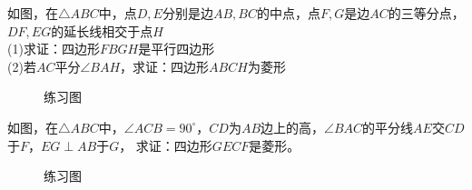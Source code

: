 \begin{problem}
如图，在$\triangle ABC$中，点$D,E$分别是边$AB,BC$的中点，点$F,G$是边$AC$的三等分点，$DF,EG$的延长线相交于点$H$ \\
(1)求证：四边形$FBGH$是平行四边形 \\
(2)若$AC$平分$\angle BAH$，求证：四边形$ABCH$为菱形 \\
\end{problem}
\begin{figure}[H]
    \centering
    \resizebox{4cm}{!}{}
    \caption{练习图}
\end{figure}
\begin{problem}
如图，在$\triangle ABC$中，$\angle ACB=90^\circ$，$CD$为$AB$边上的高，$\angle BAC$的平分线$AE$交$CD$于$F$，$EG\perp AB$于$G$，
求证：四边形$GECF$是菱形。
\end{problem}
\begin{figure}[H]
    \centering
    \resizebox{4cm}{!}{}
    \caption{练习图}
\end{figure}
\clearpage
